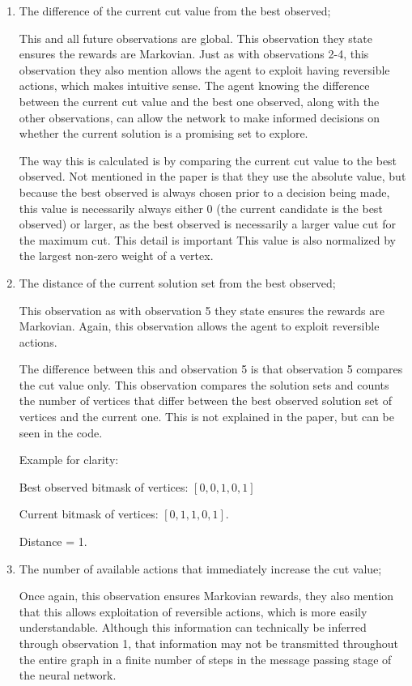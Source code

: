 \documentclass{article}
\begin{document}
\begin{enumerate}
    \item The difference of the current cut value from the best observed;
    
    This and all future observations are global. This observation they state ensures the rewards are Markovian. Just as with observations 2-4, this observation they also mention allows the agent to exploit having reversible actions, which makes intuitive sense. The agent knowing the difference between the current cut value and the best one observed, along with the other observations, can allow the network to make informed decisions on whether the current solution is a promising set to explore.

    The way this is calculated is by comparing the current cut value to the best observed. Not mentioned in the paper is that they use the absolute value, but because the best observed is always chosen prior to a decision being made, this value is necessarily always either $0$ (the current candidate is the best observed) or larger, as the best observed is necessarily a larger value cut for the maximum cut. This detail is important  This value is also normalized by the largest non-zero weight of a vertex. 

    \item The distance of the current solution set from the best observed;
    
    This observation as with observation 5 they state ensures the rewards are Markovian. Again, this observation allows the agent to exploit reversible actions. 

    The difference between this and observation 5 is that observation 5 compares the cut value only. This observation compares the solution sets and counts the number of vertices that differ between the best observed solution set of vertices and the current one. This is not explained in the paper, but can be seen in the code.

    Example for clarity:

    Best observed bitmask of vertices: $[0, 0, 1, 0, 1]$

    Current bitmask of vertices: $[0, 1, 1, 0, 1]$.

    Distance = 1. 

    \item The number of available actions that immediately increase the cut value;
    
    Once again, this observation ensures Markovian rewards, they also mention that this allows exploitation of reversible actions, which is more easily understandable. Although this information can technically be inferred through observation 1, that information may not be transmitted throughout the entire graph in a finite number of steps in the message passing stage of the neural network. 


\end{enumerate}
\end{document}
